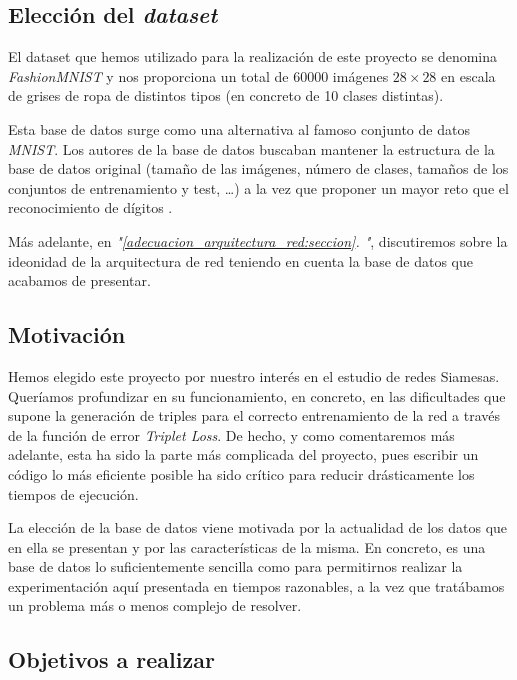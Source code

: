 \documentclass[11pt]{article}
\newcommand{\customcite}[1]{\emph{"\ref{#1}. \nameref{#1}"}}
\begin{document}
\subsection{Elección del \emph{dataset}}

El dataset que hemos utilizado para la realización de este proyecto se denomina \emph{FashionMNIST} \cite{zalando_dataset:online} y nos proporciona un total de 60000 imágenes $28 \times 28$ en escala de grises de ropa de distintos tipos (en concreto de 10 clases distintas). 

Esta base de datos surge como una alternativa al famoso conjunto de datos \emph{MNIST}. Los autores de la base de datos buscaban mantener la estructura de la base de datos original (tamaño de las imágenes, número de clases, tamaños de los conjuntos de entrenamiento y test, \ldots) a la vez que proponer un mayor reto que el reconocimiento de dígitos \cite{database_why:online}.

Más adelante, en \customcite{adecuacion_arquitectura_red:seccion}, discutiremos sobre la ideonidad de la arquitectura de red teniendo en cuenta la base de datos que acabamos de presentar.

\subsection{Motivación} \label{motivacion:seccion}

Hemos elegido este proyecto por nuestro interés en el estudio de redes Siamesas. Queríamos profundizar en su funcionamiento, en concreto, en las dificultades que supone la generación de triples para el correcto entrenamiento de la red a través de la función de error \emph{Triplet Loss}. De hecho, y como comentaremos más adelante, esta ha sido la parte más complicada del proyecto, pues escribir un código lo más eficiente posible ha sido crítico para reducir drásticamente los tiempos de ejecución.

La elección de la base de datos viene motivada por la actualidad de los datos que en ella se presentan y por las características de la misma. En concreto, es una base de datos lo suficientemente sencilla como para permitirnos realizar la experimentación aquí presentada en tiempos razonables, a la vez que tratábamos un problema más o menos complejo de resolver.

\subsection{Objetivos a realizar}
\end{document}
